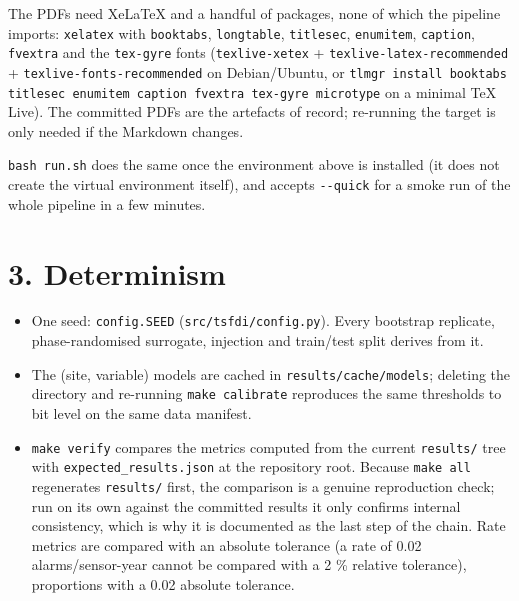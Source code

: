 \documentclass[10pt,a4paper]{article}
\begin{document}
The PDFs need XeLaTeX and a handful of packages, none of which the pipeline imports: \texttt{xelatex} with \texttt{booktabs}, \texttt{longtable}, \texttt{titlesec}, \texttt{enumitem}, \texttt{caption}, \texttt{fvextra} and the \texttt{tex-\allowbreak{}gyre} fonts (\texttt{texlive-\allowbreak{}xetex} + \texttt{texlive-\allowbreak{}latex-\allowbreak{}recommended} + \texttt{texlive-\allowbreak{}fonts-\allowbreak{}recommended} on Debian/\allowbreak{}Ubuntu, or \texttt{tlmgr install booktabs titlesec enumitem caption fvextra tex-\allowbreak{}gyre microtype} on a minimal TeX Live). The committed PDFs are the artefacts of record; re-\allowbreak{}running the target is only needed if the Markdown changes.

\texttt{bash run.sh} does the same once the environment above is installed (it does not create the virtual environment itself), and accepts \texttt{-\allowbreak{}-\allowbreak{}quick} for a smoke run of the whole pipeline in a few minutes.

\section*{3. Determinism}
\begin{itemize}
\item One seed: \texttt{config.SEED} (\texttt{src/\allowbreak{}tsfdi/\allowbreak{}config.py}). Every bootstrap replicate,
phase-\allowbreak{}randomised surrogate, injection and train/\allowbreak{}test split derives from it.

\item The (site, variable) models are cached in \texttt{results/\allowbreak{}cache/\allowbreak{}models}; deleting the
directory and re-\allowbreak{}running \texttt{make calibrate} reproduces the same thresholds to bit level on the same data manifest.

\item \texttt{make verify} compares the metrics computed from the current \texttt{results/\allowbreak{}} tree
with \texttt{expected\_\allowbreak{}results.json} at the repository root. Because \texttt{make all} regenerates \texttt{results/\allowbreak{}} first, the comparison is a genuine reproduction check; run on its own against the committed results it only confirms internal consistency, which is why it is documented as the last step of the chain. Rate metrics are compared with an absolute tolerance (a rate of 0.02 alarms/\allowbreak{}sensor-\allowbreak{}year cannot be compared with a 2 \% relative tolerance), proportions with a 0.02 absolute tolerance.

\end{itemize}
\end{document}
